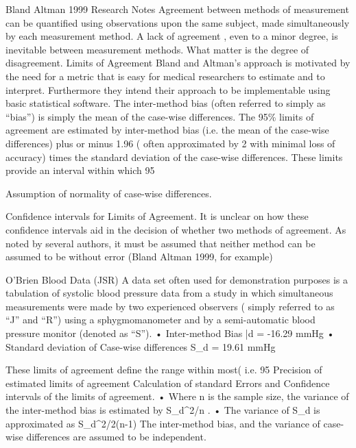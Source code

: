 Bland Altman 1999 Research Notes
Agreement between methods of measurement can be quantified using observations upon the same subject, made simultaneously  by each measurement method.
A lack of agreement , even to a minor degree, is inevitable between measurement methods. What matter is the degree of disagreement.
Limits of Agreement
Bland and Altman’s approach is motivated by the need for a metric that is easy for medical researchers to estimate and to interpret. Furthermore they intend their approach to be implementable using basic statistical software.
The inter-method bias (often referred to simply as “bias”) is simply the mean of the case-wise differences.
The 95\% limits of agreement are estimated by inter-method bias (i.e. the mean of the case-wise differences) plus or minus 1.96 ( often approximated by 2 with minimal loss of accuracy) times the standard deviation of the case-wise differences. These limits provide an interval within which 95%

Assumption of normality of case-wise differences.

Confidence intervals for Limits of Agreement.
It is unclear on how these confidence intervals aid in the decision of whether two methods of agreement.
As noted by several authors, it must be assumed that neither method can be assumed to be without error (Bland Altman 1999, for example)


O’Brien Blood Data (JSR)
A data set often used for demonstration purposes  is  a tabulation of systolic  blood pressure data from a study in which simultaneous measurements were made by two experienced observers ( simply referred to as “J” and “R”) using a sphygmomanometer and by a semi-automatic blood pressure monitor (denoted as “S”).
•	Inter-method Bias \bar{d} = -16.29 mmHg
•	Standard deviation of Case-wise differences  S_d = 19.61 mmHg

These limits of agreement define the range within most( i.e. 95%
Precision of estimated limits of agreement
Calculation of standard Errors and Confidence intervals of the limits of agreement.
•	Where n is the sample size, the variance of the inter-method bias is estimated by S_d^2/n .
•	The variance of S_d  is approximated as S_d^2/2(n-1)
The inter-method bias, and the variance of case-wise differences are assumed to be independent.


